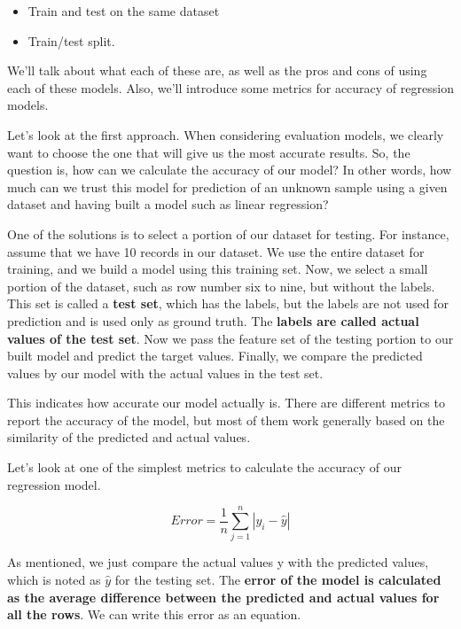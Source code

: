     \begin{itemize}
    	\item Train and test on the same dataset

    	\item Train/test split. 

    \end{itemize}  
     
    We'll talk about what each of these are, as well as the pros and cons of using each of these models. Also, we'll introduce some metrics for accuracy of regression models. 
    
    Let's look at the first approach. When considering evaluation models, we clearly want to choose the one that will give us the most accurate results. So, the question is, how can we calculate the accuracy of our model? In other words, how much can we trust this model for prediction of an unknown sample using a given dataset and having built a model such as linear regression? 
    
    One of the solutions is to select a portion of our dataset for testing. For instance, assume that we have 10 records in our dataset. We use the entire dataset for training, and we build a model using this training set. Now, we select a small portion of the dataset, such as row number six to nine, but without the labels. This set is called a \textbf{test set}, which has the labels, but the labels are not used for prediction and is used only as ground truth. The \textbf{labels are called actual values of the test set}. Now we pass the feature set of the testing portion to our built model and predict the target values. Finally, we compare the predicted values by our model with the actual values in the test set. 
    
    This indicates how accurate our model actually is. There are different metrics to report the accuracy of the model, but most of them work generally based on the similarity of the predicted and actual values. 
    
    Let's look at one of the simplest metrics to calculate the accuracy of our regression model. 
    
    \begin{equation}
    	Error = \frac{1}{n} \sum_{j=1}^{n}|y_{i}-\hat{y}| 
    \end{equation}
    
    As mentioned, we just compare the actual values y with the predicted values, which is noted as $\hat{y}$ for the testing set. The \textbf{error of the model is calculated as the average difference between the predicted and actual values for all the rows}. We can write this error as an equation. 
    
